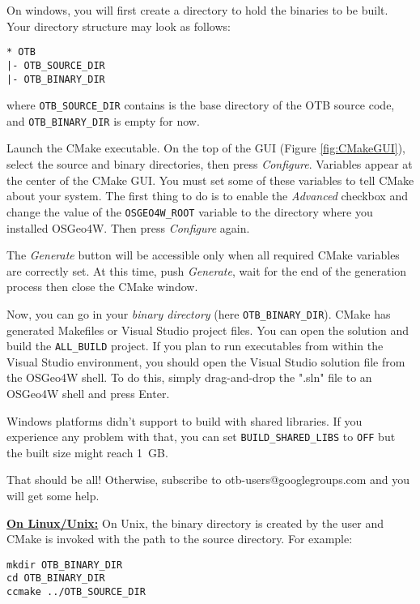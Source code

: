 On windows, you will first create a directory to hold the binaries to be built.
Your directory structure may look as follows:
\begin{verbatim}
* OTB
|- OTB_SOURCE_DIR 
|- OTB_BINARY_DIR
\end{verbatim}
where \texttt{OTB\_SOURCE\_DIR} contains is the base directory of the OTB source code, and 
\texttt{OTB\_BINARY\_DIR} is empty for now.

Launch the CMake executable. On the top of the GUI (Figure \ref{fig:CMakeGUI}), select the source and binary directories, then press \emph{Configure}.
Variables appear at the center of the CMake GUI. You must set some of these variables to tell CMake about your system. The first thing to do is to enable the \emph{Advanced} checkbox and change the value of the \texttt{OSGEO4W\_ROOT} variable to the directory where you installed OSGeo4W. Then press \emph{Configure} again.

The \emph{Generate} button will be accessible only when all required CMake variables are correctly set. At this time, push \emph{Generate}, wait for the end of the generation process then close the CMake window.

Now, you can go in your \emph{binary directory} (here \texttt{OTB\_BINARY\_DIR}). CMake has generated Makefiles or
Visual Studio project files. You can open the solution and build the \texttt{ALL\_BUILD} project.
If you plan to run executables from within the Visual Studio environment, you should open the Visual Studio 
solution file from the OSGeo4W shell. To do this, simply drag-and-drop the ".sln" file to an OSGeo4W shell 
and press Enter.

Windows platforms didn't support to build with shared libraries. If you experience any problem
with that, you can set \texttt{BUILD\_SHARED\_LIBS} to \texttt{OFF} but the
built size might reach 1~GB. 

That should be all! Otherwise, subscribe to
otb-users@googlegroups.com and you will get some help.

\textbf{\underline{On Linux/Unix:}}
On Unix, the binary directory is created by the user and CMake is invoked with the
path to the source directory. For example:
\small
\begin{verbatim}
mkdir OTB_BINARY_DIR
cd OTB_BINARY_DIR
ccmake ../OTB_SOURCE_DIR
\end{verbatim}
\normalsize

